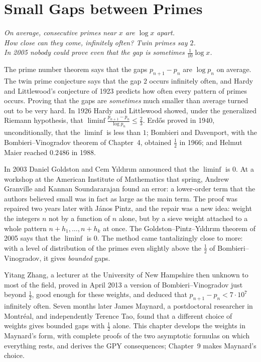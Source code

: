 \chapter{Small Gaps between Primes}
\begin{center}\itshape
On average, consecutive primes near $x$ are $\log x$ apart.\\
How close can they come, infinitely often? Twin primes say $2$.\\
In 2005 nobody could prove even that the gap is sometimes $\frac1{10}\log x$.
\end{center}

The prime number theorem says that the gaps $p_{n+1}-p_n$ are $\log p_n$ on average. The twin prime conjecture says that the gap $2$ occurs infinitely often, and Hardy and Littlewood's conjecture of 1923 predicts how often every pattern of primes occurs. Proving that the gaps are \emph{sometimes} much smaller than average turned out to be very hard. In 1926 Hardy and Littlewood showed, under the generalized Riemann hypothesis, that $\liminf\frac{p_{n+1}-p_n}{\log p_n}\le\frac23$. Erdős proved in 1940, unconditionally, that the $\liminf$ is less than $1$; Bombieri and Davenport, with the Bombieri--Vinogradov theorem of Chapter~4, obtained $\frac12$ in 1966; and Helmut Maier reached $0.2486$ in 1988.

In 2003 Daniel Goldston and Cem Yıldırım announced that the $\liminf$ is $0$. At a workshop at the American Institute of Mathematics that spring, Andrew Granville and Kannan Soundararajan found an error: a lower-order term that the authors believed small was in fact as large as the main term. The proof was repaired two years later with János Pintz, and the repair was a new idea: weight the integers $n$ not by a function of $n$ alone, but by a sieve weight attached to a whole pattern $n+h_1,\dots,n+h_k$ at once. The Goldston--Pintz--Yıldırım theorem of 2005 says that the $\liminf$ is $0$. The method came tantalizingly close to more: with a level of distribution of the primes even slightly above the $\frac12$ of Bombieri--Vinogradov, it gives \emph{bounded} gaps.

Yitang Zhang, a lecturer at the University of New Hampshire then unknown to most of the field, proved in April 2013 a version of Bombieri--Vinogradov just beyond $\frac12$, good enough for these weights, and deduced that $p_{n+1}-p_n<7\cdot10^7$ infinitely often. Seven months later James Maynard, a postdoctoral researcher in Montréal, and independently Terence Tao, found that a different choice of weights gives bounded gaps with $\frac12$ alone. This chapter develops the weights in Maynard's form, with complete proofs of the two asymptotic formulas on which everything rests, and derives the GPY consequences; Chapter~9 makes Maynard's choice.

